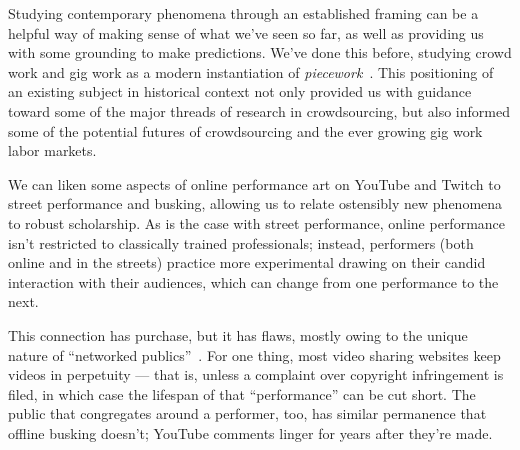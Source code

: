 \documentclass[10pt]{article}
\newcommand{\topic}[1]{{\color{Blue}#1}}
\begin{document}
\topic{Studying contemporary phenomena through an established framing
can be a helpful way of
making sense of what we've seen so far, as well as
providing us with some grounding to make predictions.}
We've done this before, studying crowd work and gig work as
a modern instantiation of \textit{piecework}~\cite{pieceworkCrowdworkGigwork}.
This positioning of an existing subject in historical context not only
provided us with guidance toward some of the major threads of research
in crowdsourcing, but
also informed some of the potential futures of crowdsourcing and
the ever growing gig work labor markets.

\topic{We can liken some aspects of online performance art on YouTube and Twitch
to street performance and busking,
allowing us to relate ostensibly new phenomena to robust scholarship.}
As is the case with street performance,
online performance isn't restricted to classically trained professionals;
instead, performers (both online and in the streets) practice more experimental 
drawing on their candid interaction with their audiences,
which can change from one performance to the next.

\topic{This connection has purchase, but it has flaws, mostly owing to the unique nature of ``networked publics''~\cite{boyd2007youth}.}
For one thing, most video sharing websites keep videos
in perpetuity
--- that is, unless a complaint over copyright infringement is filed, in which case the lifespan of that ``performance'' can be cut short.
The public that congregates around a performer, too, has similar permanence that offline busking doesn't;
YouTube comments linger for years after they're made.

\end{document}
